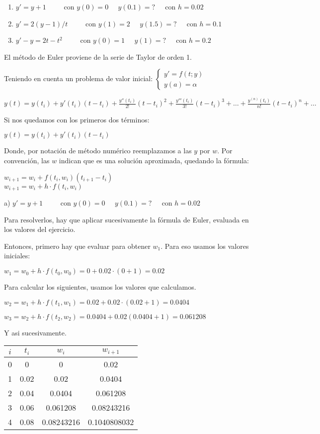 \documentclass[11pt]{article}
\begin{document}
	\begin{enumerate}[label=\alph*)]
		\item $y'=y+1 \;\;\;\;\;\;\;\;$ con $y(0)=0 \;\;\;\;\; y(0.1)=? \;\;\;\;$ con $h=0.02$
		\item $y'=2(y-1)/t \;\;\;\;\;\;\;\;$ con $y(1)=2 \;\;\;\;\; y(1.5)=? \;\;\;\;$ con $h=0.1$
		\item $y'-y=2t-t^2 \;\;\;\;\;\;\;\;$ con $y(0)=1 \;\;\;\;\; y(1)=? \;\;\;\;$ con $h=0.2$
	\end{enumerate}

	El método de Euler proviene de la serie de Taylor de orden 1.
	
	Teniendo en cuenta un problema de valor inicial: $\begin{cases}
		y'=f(t;y) \\ y(a)=\alpha
	\end{cases}$
	
	$\displaystyle y(t)=y(t_i)+y'(t_i)(t-t_i)+\frac{y''(t_i)}{2!}(t-t_i)^2+\frac{y'''(t_i)}{3!}(t-t_i)^3+\dots+\frac{y^{(n)}(t_i)}{n!}(t-t_i)^n+\dots$
	
	Si nos quedamos con los primeros dos términos:
	
	$y(t)=y(t_i)+y'(t_i)(t-t_i)$
	
	Donde, por notación de método numérico reemplazamos a las $y$ por $w$. Por convención, las $w$ indican que es una solución aproximada, quedando la fórmula:
	
	$w_{i+1}=w_i+f(t_i,w_i)(t_{i+1}-t_i)$\\
	$w_{i+1}=w_i+h\cdot f(t_i,w_i)$

	a) $y'=y+1 \;\;\;\;\;\;\;\;$ con $y(0)=0 \;\;\;\;\; y(0.1)=? \;\;\;\;$ con $h=0.02$
	
	Para resolverlos, hay que aplicar sucesivamente la fórmula de Euler, evaluada en los valores del ejercicio.
	
	Entonces, primero hay que evaluar para obtener $w_1$. Para eso usamos los valores iniciales:
	
	$w_1=w_0+h \cdot f(t_0, w_0)=0+0.02 \cdot (0+1)=0.02$
	
	Para calcular los siguientes, usamos los valores que calculamos.
	
	$w_2=w_1+h \cdot f(t_1, w_1)=0.02+0.02 \cdot (0.02+1)=0.0404$
	
	$w_3=w_2+h \cdot f(t_2, w_2)=0.0404+0.02(0.0404+1)=0.061208$
	
	Y asi sucesivamente.
	
	\begin{tabular}{|c|c|c|c|}
		\hline
		$i$ & $t_i$ & $w_i$ & $w_{i+1}$ \\
		\hline
		0 & 0 & 0 & 0.02 \\
		\hline
		1 & 0.02 & 0.02 & 0.0404\\
		\hline
		2 & 0.04 & 0.0404 & 0.061208 \\
		\hline
		3 & 0.06 & 0.061208 & 0.08243216 \\
		\hline
		4 & 0.08 & 0.08243216 & 0.1040808032 \\
		\hline
	\end{tabular}
\end{document}
